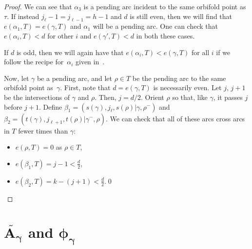 \documentclass[11pt]{article}
\numberwithin{equation}{section}
\begin{document}
\begin{proof}
We can see that $\alpha_3$ is a pending arc incident to the same orbifold point as $\tau$. If instead $j_{\ell} - 1 = j_{\ell - 1} = h-1$ and $d$ is still even, then we will find that $e(\alpha_1, T) = e(\gamma,T)$ and $\alpha_1$ will be a pending arc. One can check that $e(\alpha_i,T) < d$ for other $i$ and $e(\gamma',T) < d$ in both these cases.

\begin{center}
\end{center}

If $d$ is odd, then we will again have that $e(\alpha_i,T) < e(\gamma,T)$ for all $i$ if we follow the recipe for~$\alpha_i$ given in~\cite{MSW}.

Now, let $\gamma$ be a pending arc, and let $\rho \in T$ be the pending arc to the same orbifold point as~$\gamma$. First, note that $d = e(\gamma,T)$ is necessarily even. Let $j$, $j+1$ be the intersections of $\gamma$ and $\rho$. Then, $j = d/2$. Orient $\rho$ so that, like $\gamma$, it passes $j$ before $j + 1$. Define $\beta_1 = (s(\gamma), j_\ell, s(\rho) \vert \gamma, \rho^-)$ and $\beta_2 = (t(\gamma), j_{\ell + 1}, t(\rho) \vert \gamma^-, \rho)$. We can check that all of these arcs cross arcs in $T$ fewer times than $\gamma$:
\begin{itemize}\itemsep=0pt
\item $e(\rho, T) = 0$ as $\rho \in T$,
\item $e(\beta_1, T) = j - 1 < \frac{d}{2}$,
\item $e(\beta_2, T) = k - (j+1) < \frac{d}{2}$.\hfill \qed
\end{itemize}\renewcommand{\qed}{}
\end{proof}

\section[$\widetilde{A_\gamma}$ and $\phi_\gamma$]{$\boldsymbol{\widetilde{A_\gamma}}$ and $\boldsymbol{\phi_\gamma}$} \label{Sec:mapSection}
\end{document}
